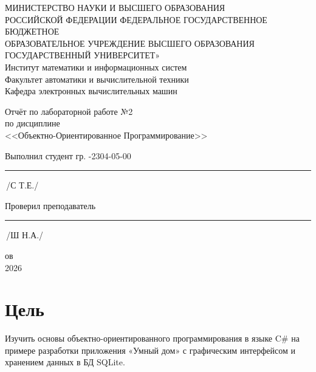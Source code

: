 \documentclass[oneside,a4paper,14pt]{extarticle}
\begin{document}
    \newpage\thispagestyle{empty}
    \begin{center}
        МИНИСТЕРСТВО НАУКИ И ВЫСШЕГО ОБРАЗОВАНИЯ\\
            РОССИЙСКОЙ ФЕДЕРАЦИИ
            ФЕДЕРАЛЬНОЕ ГОСУДАРСТВЕННОЕ БЮДЖЕТНОЕ\\
            ОБРАЗОВАТЕЛЬНОЕ
            УЧРЕЖДЕНИЕ ВЫСШЕГО ОБРАЗОВАНИЯ\\
             ГОСУДАРСТВЕННЫЙ УНИВЕРСИТЕТ»\\
            Институт математики и информационных систем\\
            Факультет автоматики и вычислительной техники\\
            Кафедра электронных вычислительных машин
    \end{center}
    \vspace{20mm}

    \begin{center}
        Отчёт по лабораторной работе №2\\
        по дисциплине\\
        <<Объектно-Ориентированное Программирование>>\\
    \end{center}
    \vspace{48mm}

    Выполнил студент гр. -2304-05-00 \hspace{7mm} \rule[-0,5mm]{16mm}{0.15mm}\,/С Т.Е./


    Проверил преподаватель \hfill  \rule[-0,5mm]{30mm}{0.15mm}\,/Ш Н.А./

    \vfill
    \begin{center}
        ов\\
        2026
    \end{center}
    \newpage

    \section*{Цель}
Изучить основы объектно-ориентированного программирования в языке C# на примере разработки приложения «Умный дом» с графическим интерфейсом и хранением данных в БД SQLite.
\end{document}
